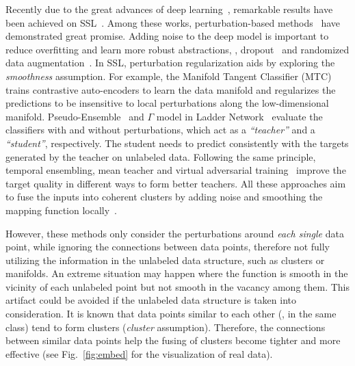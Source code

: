 \documentclass[10pt,twocolumn,letterpaper]{article}
\begin{document}
Recently due to the great advances of deep learning~\cite{krizhevsky2012imagenet}, remarkable results have been achieved on SSL~\cite{kingma2014semi,rasmus2015semi,salimans2016improved,laine2016temporal}. Among these works, perturbation-based methods~\cite{rifai2011manifold,bachman2014learning,rasmus2015semi,sajjadi2016regularization,laine2016temporal} have demonstrated great promise.
Adding noise to the deep model is important to reduce overfitting and learn more robust abstractions, \eg, dropout~\cite{hinton2012improving} and randomized data augmentation~\cite{ciregan2012multi}. In SSL, perturbation regularization aids by exploring the \emph{smoothness} assumption. For example, the Manifold Tangent Classifier (MTC)~\cite{rifai2011manifold} trains contrastive auto-encoders to learn the data manifold and regularizes the predictions to be insensitive to local perturbations along the low-dimensional manifold. Pseudo-Ensemble~\cite{bachman2014learning} and $\Gamma$ model in Ladder Network~\cite{rasmus2015semi} evaluate the classifiers with and without perturbations, which act as a \emph{``teacher''} and a \emph{``student''}, respectively. The student needs to predict consistently with the targets generated by the teacher on unlabeled data. Following the same principle, temporal ensembling, mean teacher and virtual adversarial training~\cite{laine2016temporal,tarvainen2017mean,miyato2017virtual} improve the target quality in different ways to form better teachers.
All these approaches aim to fuse the inputs into coherent clusters by adding noise and smoothing the mapping function locally~\cite{laine2016temporal}.

However, these methods only consider the perturbations around \emph{each single} data point, while ignoring the connections between data points, therefore not fully utilizing the information in the unlabeled data structure, such as clusters or manifolds.
An extreme situation may happen where the function is smooth in the vicinity of each unlabeled point but not smooth in the vacancy among them. This artifact could be avoided if the unlabeled data structure is taken into consideration.
It is known that data points similar to each other (\eg, in the same class) tend to form clusters (\emph{cluster} assumption). Therefore, the connections between similar data points help the fusing of clusters become tighter and more effective (see Fig.~\ref{fig:embed} for the visualization of real data).
\end{document}

